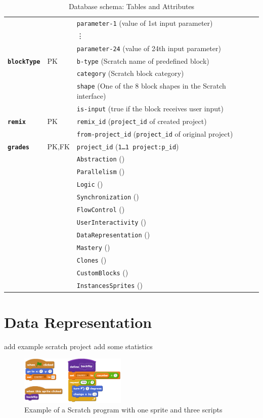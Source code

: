 \documentclass[10pt, conference]{IEEEtran}
\begin{document}
\begin{table}[ht]
\begin{tabular}{llp{5.4cm}}
		&  & \texttt{parameter-1} (value of 1st input parameter)\\
		&  &\vdots\\
		&  & \texttt{parameter-24} (value of 24th input parameter)\\
		\hline
		\textbf{\texttt{blockType}} & PK & \texttt{b-type} (Scratch name of predefined block)\\
		&  & \texttt{category} (Scratch block category)\\
		&  & \texttt{shape} (One of the 8 block shapes in the Scratch interface)\\
		&  & \texttt{is-input} (true if the block receives user input)\\
		\hline
		\textbf{\texttt{remix}} & PK  & \texttt{remix\_id} (\texttt{\scriptsize{project\_id}} of created project)\\
		&  & \texttt{from-project\_id} (\texttt{\scriptsize{project\_id}} of original project)\\
		\hline
		\textbf{\texttt{grades}} & PK,FK & \texttt{project\_id} (\texttt{\scriptsize{1\ldots1 project:p\_id}})\\
		& & \texttt{Abstraction} ()\\
		& & \texttt{Parallelism} ()\\
		& & \texttt{Logic} ()\\
		& & \texttt{Synchronization} ()\\
		& & \texttt{FlowControl} ()\\
		& & \texttt{UserInteractivity} ()\\
		& & \texttt{DataRepresentation} ()\\
		& & \texttt{Mastery} ()\\
		& & \texttt{Clones} ()\\
		& & \texttt{CustomBlocks} ()\\
		& & \texttt{InstancesSprites} ()\\
		\hline
	\end{tabular}
	\caption{Database schema: Tables and Attributes}
	\label{tbl-dbschema}
\end{table}

\section{Data Representation}

add example scratch project
add some statistics

\begin{figure}
	\centering
	\includegraphics[width=0.45\textwidth]{scratchExample}
	\caption{Example of a Scratch program with one sprite and three scripts}
	\label{fig-scratchExample}
\end{figure}
\end{document}
